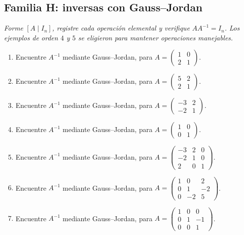 \documentclass[12pt]{article}
\theoremstyle{remark}
\newcounter{contadorEjercicio}
\newenvironment{listaejercicios}{\begin{enumerate}[label=\textbf{E\arabic*.},leftmargin=2.4em,itemsep=0.52em]\setcounter{enumi}{\value{contadorEjercicio}}}{\setcounter{contadorEjercicio}{\value{enumi}}\end{enumerate}}
\begin{document}
\subsection{Familia H: inversas con Gauss--Jordan}\noindent\textit{Forme $[A\mid I_n]$, registre cada operación elemental y verifique $AA^{-1}=I_n$. Los ejemplos de orden $4$ y $5$ se eligieron para mantener operaciones manejables.}\par\medskip
\begin{listaejercicios}

\item Encuentre $A^{-1}$ mediante Gauss--Jordan, para $A=\begin{pmatrix}1&0\\2&1\end{pmatrix}$.

\item Encuentre $A^{-1}$ mediante Gauss--Jordan, para $A=\begin{pmatrix}5&2\\2&1\end{pmatrix}$.

\item Encuentre $A^{-1}$ mediante Gauss--Jordan, para $A=\begin{pmatrix}-3&2\\-2&1\end{pmatrix}$.

\item Encuentre $A^{-1}$ mediante Gauss--Jordan, para $A=\begin{pmatrix}1&0\\0&1\end{pmatrix}$.

\item Encuentre $A^{-1}$ mediante Gauss--Jordan, para $A=\begin{pmatrix}-3&2&0\\-2&1&0\\2&0&1\end{pmatrix}$.

\item Encuentre $A^{-1}$ mediante Gauss--Jordan, para $A=\begin{pmatrix}1&0&2\\0&1&-2\\0&-2&5\end{pmatrix}$.

\item Encuentre $A^{-1}$ mediante Gauss--Jordan, para $A=\begin{pmatrix}1&0&0\\0&1&-1\\0&0&1\end{pmatrix}$.


\end{listaejercicios}
\end{document}
